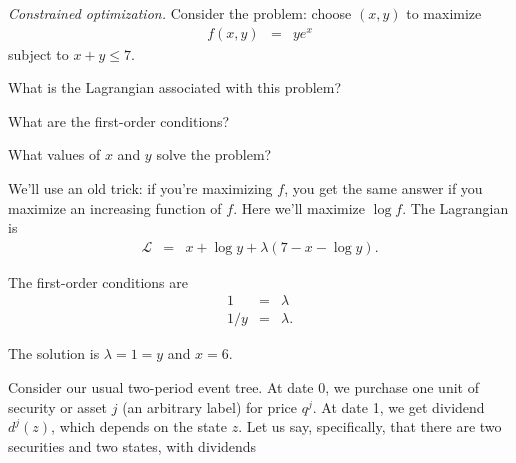 \documentclass[11pt]{exam}
\begin{document}
\begin{questions}
\begin{solution}
\end{solution}


\item {\it Constrained optimization.\/}
Consider the problem:  choose $(x,y)$ to maximize
\begin{eqnarray*}
    f(x,y) &=& y e^x
\end{eqnarray*}
subject to $ x + y \leq 7$.
%
\begin{parts}
\item What is the Lagrangian associated with this problem?
\item What are the first-order conditions?
\item What values of $x$ and $y$ solve the problem?
\end{parts}
%
\begin{solution}
\begin{parts}
\item We'll use an old trick:  if you're maximizing $f$,
you get the same answer if you maximize an increasing function of $f$.
Here we'll maximize $\log f$.
The Lagrangian is
\begin{eqnarray*}
    \mathcal{L} &=& x + \log y  + \lambda (7 - x - \log y ).
\end{eqnarray*}
\item The first-order conditions are
\begin{eqnarray*}
    1 &=& \lambda \\
    1/y &=& \lambda .
\end{eqnarray*}
\item The solution is $\lambda = 1 = y$ and $x = 6$.
\end{parts}
\end{solution}

Consider our usual two-period event tree.
At date 0, we purchase one unit of security or asset $j$ (an arbitrary label) for price $q^j$.
At date 1, we get dividend $d^j(z)$, which depends on the state $z$.
Let us say, specifically,
that there are two securities and two states, with dividends


\end{questions}
\end{document}
